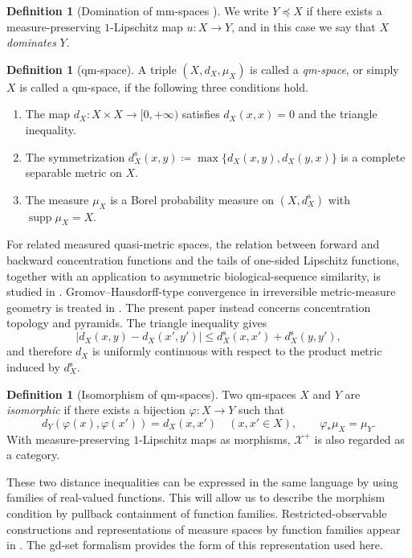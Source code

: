 \documentclass{amsart}
\theoremstyle{plain}
\theoremstyle{definition}
\newtheorem{definition}[theorem]{Definition}
\newtheorem*{definition*}{Definition}
\theoremstyle{remark}
\newcommand{\Xp}{\mathcal{X}^{+}}
\DeclareMathOperator{\supp}{supp}
\begin{document}
\begin{definition*}[Domination of mm-spaces {\cite[Definition~2.10]{shioya2016mmg}}]
We write $Y\preceq X$ if there exists a measure-preserving $1$-Lipschitz map $u\colon X\to Y$, and in this case we say that $X$ \emph{dominates} $Y$.
\end{definition*}

\begin{definition}[qm-space]
\label{def:asymmetric-mm-space}
A triple $(X,d_X,\mu_X)$ is called a \emph{qm-space}, or simply $X$ is called a qm-space, if the following three conditions hold.
\begin{enumerate}[label=\textup{(\roman*)}]
\item The map $d_X\colon X\times X\to[0,+\infty)$ satisfies $d_X(x,x)=0$ and the triangle inequality.
\item The symmetrization $d_X^{\mathrm s}(x,y)\coloneqq\max\{d_X(x,y),d_X(y,x)\}$ is a complete separable metric on $X$.
\item The measure $\mu_X$ is a Borel probability measure on $(X,d_X^{\mathrm s})$ with $\supp\mu_X=X$.
\end{enumerate}
\end{definition}
For related measured quasi-metric spaces, the relation between forward and backward concentration functions and the tails of one-sided Lipschitz functions, together with an application to asymmetric biological-sequence similarity, is studied in \cite[Definition~3.2 and Lemma~3.6]{stojmirovic2004quasi}. Gromov--Hausdorff-type convergence in irreversible metric-measure geometry is treated in \cite{kristaly-zhao2022geometry}. The present paper instead concerns concentration topology and pyramids.
The triangle inequality gives
\[|d_X(x,y)-d_X(x',y')|\leq d_X^{\mathrm s}(x,x')+d_X^{\mathrm s}(y,y'),\]
and therefore $d_X$ is uniformly continuous with respect to the product metric induced by $d_X^{\mathrm s}$.

\begin{definition}[Isomorphism of qm-spaces]
\label{def:asymmetric-mm-space-isomorphism}
Two qm-spaces $X$ and $Y$ are \emph{isomorphic} if there exists a bijection $\varphi\colon X\to Y$ such that
\[d_Y(\varphi(x),\varphi(x'))=d_X(x,x')\quad(x,x'\in X),\qquad \varphi_*\mu_X=\mu_Y.\]
With measure-preserving $1$-Lipschitz maps as morphisms, $\Xp$ is also regarded as a category.
\end{definition}

These two distance inequalities can be expressed in the same language by using families of real-valued functions. This will allow us to describe the morphism condition by pullback containment of function families.
Restricted-observable constructions and representations of measure spaces by function families appear in \cite{pestov2008gds,hanika2022gds}. The gd-set formalism provides the form of this representation used here.
\end{document}
